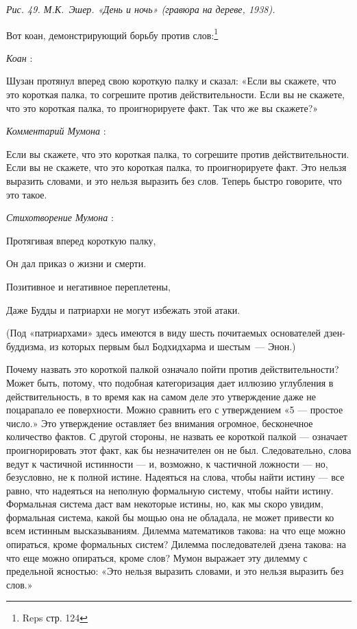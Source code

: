 \documentclass[../main.tex]{subfiles}
\begin{document}
\emph{Рис. 49. М.К.~Эшер. «День и ночь» (гравюра на дереве, 1938).}

Вот коан, демонстрирующий борьбу против слов:\footnote{Reps стр. 124}

\emph{Коан} :

Шузан протянул вперед свою короткую палку и сказал: «Если вы скажете, что это короткая палка, то согрешите против действительности. Если вы не скажете, что это короткая палка, то проигнорируете факт. Так что же вы скажете?»

\emph{Комментарий Мумона} :

Если вы скажете, что это короткая палка, то согрешите против действительности. Если вы не скажете, что это короткая палка, то проигнорируете факт. Это нельзя выразить словами, и это нельзя выразить без слов. Теперь быстро говорите, что это такое.

\emph{Стихотворение Мумона} :

Протягивая вперед короткую палку,

Он дал приказ о жизни и смерти.

Позитивное и негативное переплетены,

Даже Будды и патриархи не могут избежать этой атаки.

(Под «патриархами» здесь имеются в виду шесть почитаемых основателей дзен-буддизма, из которых первым был Бодхидхарма и шестым~--- Энон.)

Почему назвать это короткой палкой означало пойти против действительности? Может быть, потому, что подобная категоризация дает иллюзию углубления в действительность, в то время как на самом деле это утверждение даже не поцарапало ее поверхности. Можно сравнить его с утверждением «5 --- простое число.» Это утверждение оставляет без внимания огромное, бесконечное количество фактов. С другой стороны, не назвать ее короткой палкой --- означает проигнорировать этот факт, как бы незначителен он не был. Следовательно, слова ведут к частичной истинности --- и, возможно, к частичной ложности --- но, безусловно, не к полной истине. Надеяться на слова, чтобы найти истину --- все равно, что надеяться на неполную формальную систему, чтобы найти истину. Формальная система даст вам некоторые истины, но, как мы скоро увидим, формальная система, какой бы мощью она не обладала, не может привести ко всем истинным высказываниям. Дилемма математиков такова: на что еще можно опираться, кроме формальных систем? Дилемма последователей дзена такова: на что еще можно опираться, кроме слов? Мумон выражает эту дилемму с предельной ясностью: «Это нельзя выразить словами, и это нельзя выразить без слов.»
\end{document}
